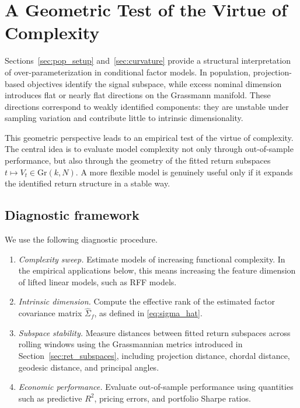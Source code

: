 \documentclass[11pt,letterpaper]{article}
\newcommand{\gr}{\mathrm{Gr}}
\begin{document}
\section{A Geometric Test of the Virtue of Complexity}
\label{sec:geom_tests}

Sections~\ref{sec:pop_setup} and~\ref{sec:curvature} provide a structural interpretation of over-parameterization in conditional factor models. In population, projection-based objectives identify the signal subspace, while excess nominal dimension introduces flat or nearly flat directions on the Grassmann manifold. These directions correspond to weakly identified components: they are unstable under sampling variation and contribute little to intrinsic dimensionality.

This geometric perspective leads to an empirical test of the virtue of complexity. The central idea is to evaluate model complexity not only through out-of-sample performance, but also through the geometry of the fitted return subspaces $t\mapsto V_t\in\gr(k,N)$. A more flexible model is genuinely useful only if it expands the identified return structure in a stable way.

\subsection{Diagnostic framework}
\label{subsec:diagnostic-framework}

We use the following diagnostic procedure.

\begin{enumerate}[label=(\roman*)]
\item \emph{Complexity sweep.} Estimate models of increasing functional complexity. In the empirical applications below, this means increasing the feature dimension of lifted linear models, such as RFF models.

\item \emph{Intrinsic dimension.} Compute the effective rank of the estimated factor covariance matrix $\hat{\Sigma}_f$, as defined in \eqref{eq:sigma_hat}.

\item \emph{Subspace stability.} Measure distances between fitted return subspaces across rolling windows using the Grassmannian metrics introduced in Section~\ref{sec:ret_subspaces}, including projection distance, chordal distance, geodesic distance, and principal angles.

\item \emph{Economic performance.} Evaluate out-of-sample performance using quantities such as predictive $R^2$, pricing errors, and portfolio Sharpe ratios.
\end{enumerate}
\end{document}
